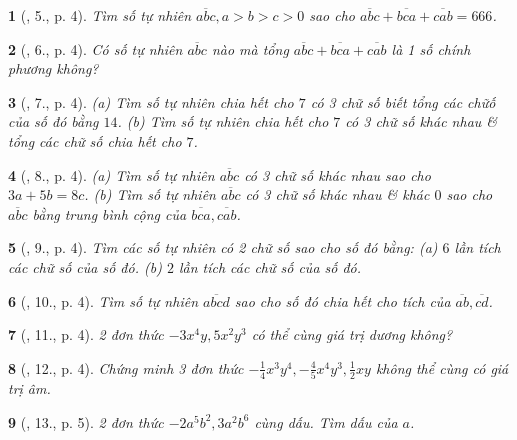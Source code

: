 \documentclass{article}
\newtheorem{baitoan}{}
\begin{document}
\begin{baitoan}[\cite{Binh_Toan_8_tap_1}, 5., p. 4]
	Tìm số tự nhiên $\overline{abc},a > b > c > 0$ sao cho $\overline{abc} + \overline{bca} + \overline{cab} = 666$.
\end{baitoan}

\begin{baitoan}[\cite{Binh_Toan_8_tap_1}, 6., p. 4]
	Có số tự nhiên $\overline{abc}$ nào mà tổng $\overline{abc} + \overline{bca} + \overline{cab}$ là 1 số chính phương không?
\end{baitoan}

\begin{baitoan}[\cite{Binh_Toan_8_tap_1}, 7., p. 4]
	(a) Tìm số tự nhiên chia hết cho $7$ có 3 chữ số biết tổng các chữố của số đó bằng $14$. (b) Tìm số tự nhiên chia hết cho $7$ có 3 chữ số khác nhau \& tổng các chữ số chia hết cho $7$.
\end{baitoan}

\begin{baitoan}[\cite{Binh_Toan_8_tap_1}, 8., p. 4]
	(a) Tìm số tự nhiên $\overline{abc}$ có 3 chữ số khác nhau sao cho $3a + 5b = 8c$. (b) Tìm số tự nhiên $\overline{abc}$ có 3 chữ số khác nhau \& khác $0$ sao cho $\overline{abc}$ bằng trung bình cộng của $\overline{bca},\overline{cab}$.
\end{baitoan}

\begin{baitoan}[\cite{Binh_Toan_8_tap_1}, 9., p. 4]
	Tìm các số tự nhiên có 2 chữ số sao cho số đó bằng: (a) $6$ lần tích các chữ số của số đó. (b) $2$ lần tích các chữ số của số đó.
\end{baitoan}

\begin{baitoan}[\cite{Binh_Toan_8_tap_1}, 10., p. 4]
	Tìm số tự nhiên $\overline{abcd}$ sao cho số đó chia hết cho tích của $\overline{ab},\overline{cd}$.
\end{baitoan}

\begin{baitoan}[\cite{Binh_Toan_8_tap_1}, 11., p. 4]
	2 đơn thức $-3x^4y,5x^2y^3$ có thể cùng giá trị dương không?
\end{baitoan}

\begin{baitoan}[\cite{Binh_Toan_8_tap_1}, 12., p. 4]
	Chứng minh 3 đơn thức $-\frac{1}{4}x^3y^4,-\frac{4}{5}x^4y^3,\frac{1}{2}xy$ không thể cùng có giá trị âm.
\end{baitoan}

\begin{baitoan}[\cite{Binh_Toan_8_tap_1}, 13., p. 5]
	2 đơn thức $-2a^5b^2,3a^2b^6$ cùng dấu. Tìm dấu của $a$.
\end{baitoan}
\end{document}
